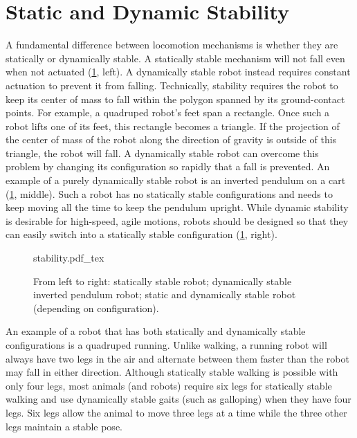 
\section{Static and Dynamic Stability}\label{sec:stability}

A fundamental difference between locomotion mechanisms is whether they are statically or dynamically stable. A statically stable mechanism will not fall even when not actuated (\cref{fig:stability}, left). A dynamically stable robot instead requires constant actuation to prevent it from falling. Technically, stability requires the robot to keep its center of mass to fall within the polygon spanned by its ground-contact points. For example, a quadruped robot's feet span a rectangle. Once such a robot lifts one of its feet, this rectangle becomes a triangle. If the projection of the center of mass of the robot along the direction of gravity is outside of this triangle, the robot will fall. A dynamically stable robot can overcome this problem by changing its configuration so rapidly that a fall is prevented. An example of a purely dynamically stable robot is an inverted pendulum on a cart (\cref{fig:stability}, middle). Such a robot has no statically stable configurations and needs to keep moving all the time to keep the pendulum upright. While dynamic stability is desirable for high-speed, agile motions, robots should be designed so that they can easily switch into a statically stable configuration (\cref{fig:stability}, right).

\begin{figure}
    \centering
    \def\svgwidth{\textwidth}
    {stability.pdf_tex}
    \caption{From left to right: statically stable robot; dynamically stable inverted pendulum robot; static and dynamically stable robot (depending on configuration).}
    \label{fig:stability}
\end{figure}

An example of a robot that has both statically and dynamically stable configurations is a quadruped running. Unlike walking, a running robot will always have two legs in the air and alternate between them faster than the robot may fall in either direction. Although statically stable walking is possible with only four legs, most animals (and robots) require six legs for statically stable walking and use dynamically stable gaits (such as galloping) when they have four legs. Six legs allow the animal to move three legs at a time while the three other legs maintain a stable pose.


